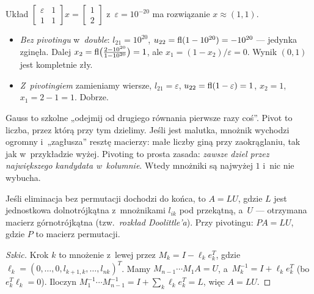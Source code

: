 \documentclass[11pt]{article}
\begin{document}
\begin{przyklad}
Układ $\left[\begin{smallmatrix}\varepsilon&1\\1&1\end{smallmatrix}\right]x
=\left[\begin{smallmatrix}1\\2\end{smallmatrix}\right]$ z~$\varepsilon=10^{-20}$
ma rozwiązanie $x\approx(1,1)$.
\begin{itemize}
\item \emph{Bez pivotingu} w~\emph{double}: $l_{21}=10^{20}$,
$u_{22}=\operatorname{fl}(1-10^{20})=-10^{20}$ --- jedynka zginęła. Dalej
$x_2=\operatorname{fl}\bigl(\frac{2-10^{20}}{1-10^{20}}\bigr)=1$, ale
$x_1=(1-x_2)/\varepsilon=0$. Wynik $(0,1)$ jest kompletnie zły.
\item \emph{Z~pivotingiem} zamieniamy wiersze, $l_{21}=\varepsilon$,
$u_{22}=\operatorname{fl}(1-\varepsilon)=1$, $x_2=1$, $x_1=2-1=1$. Dobrze.
\end{itemize}
\end{przyklad}

\begin{poludzku}
Gauss to szkolne „odejmij od drugiego równania pierwsze razy coś”.
Pivot to liczba, przez którą przy tym dzielimy. Jeśli jest malutka,
mnożnik wychodzi ogromny i~„zagłusza” resztę macierzy: małe liczby giną
przy zaokrąglaniu, tak jak w~przykładzie wyżej. Pivoting to prosta
zasada: \emph{zawsze dziel przez największego kandydata w~kolumnie}.
Wtedy mnożniki są najwyżej $1$ i~nic nie wybucha.
\end{poludzku}

\begin{twierdzenie}[Eliminacja Gaussa $=$ rozkład LU]\label{tw:lu}
Jeśli eliminacja bez permutacji dochodzi do końca, to $A=LU$, gdzie
$L$ jest jednostkowa dolnotrójkątna z~mnożnikami $l_{ik}$ pod przekątną,
a~$U$ --- otrzymana macierz górnotrójkątna (tzw.\ \emph{rozkład Doolittle'a}).
Przy pivotingu: $PA=LU$, gdzie $P$ to macierz permutacji.
\end{twierdzenie}

\begin{proof}[Szkic]
Krok $k$ to mnożenie z~lewej przez $M_k=I-\ell_ke_k^{T}$, gdzie
$\ell_k=(0,\ldots,0,l_{k+1,k},\ldots,l_{nk})^T$. Mamy
$M_{n-1}\cdots M_1A=U$, a~$M_k^{-1}=I+\ell_ke_k^T$ (bo $e_k^T\ell_k=0$).
Iloczyn $M_1^{-1}\cdots M_{n-1}^{-1}=I+\sum_k\ell_ke_k^T=L$, więc $A=LU$.
\end{proof}
\end{document}
